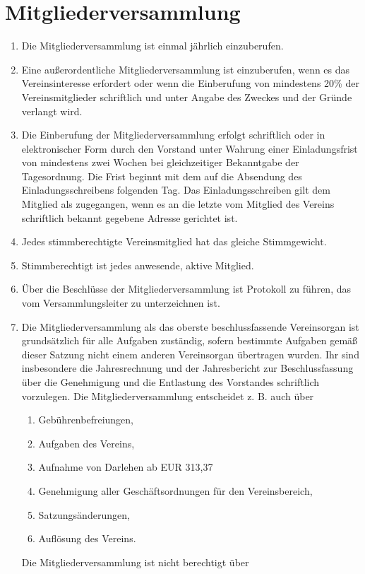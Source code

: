 \documentclass[a4paper,ngerman]{scrartcl}
\begin{document}
\section{Mitgliederversammlung}
\begin{enumerate}
\item Die Mitgliederversammlung ist einmal jährlich einzuberufen.
\item Eine außerordentliche Mitgliederversammlung ist einzuberufen, wenn es das Vereinsinteresse erfordert oder wenn die Einberufung von mindestens 20\% der Vereinsmitglieder schriftlich und unter Angabe des Zweckes und der Gründe verlangt wird.
\item Die Einberufung der Mitgliederversammlung erfolgt schriftlich oder in elektronischer Form durch den Vorstand unter Wahrung einer Einladungsfrist von mindestens zwei Wochen bei gleichzeitiger Bekanntgabe der Tagesordnung. Die Frist beginnt mit dem auf die Absendung des Einladungsschreibens folgenden Tag. Das Einladungsschreiben gilt dem Mitglied als zugegangen, wenn es an die letzte vom Mitglied des Vereins schriftlich bekannt gegebene Adresse gerichtet ist.
\item Jedes stimmberechtigte Vereinsmitglied hat das gleiche Stimmgewicht.
\item Stimmberechtigt ist jedes anwesende, aktive Mitglied.
\item Über die Beschlüsse der Mitgliederversammlung ist Protokoll zu führen, das vom Versammlungsleiter zu unterzeichnen ist.
\item Die Mitgliederversammlung als das oberste beschlussfassende Vereinsorgan ist grundsätzlich für alle Aufgaben zuständig, sofern bestimmte Aufgaben gemäß dieser Satzung nicht einem anderen Vereinsorgan übertragen wurden. Ihr sind insbesondere die Jahresrechnung und der Jahresbericht zur Beschlussfassung über die Genehmigung und die Entlastung des Vorstandes schriftlich vorzulegen. Die Mitgliederversammlung entscheidet z. B. auch über
\begin{enumerate}
\item Gebührenbefreiungen,
\item Aufgaben des Vereins,
\item Aufnahme von Darlehen ab EUR 313,37
\item Genehmigung aller Geschäftsordnungen für den Vereinsbereich,
\item Satzungsänderungen,
\item Auflösung des Vereins.
\end{enumerate}
Die Mitgliederversammlung ist nicht berechtigt über 

\end{enumerate}
\end{document}
